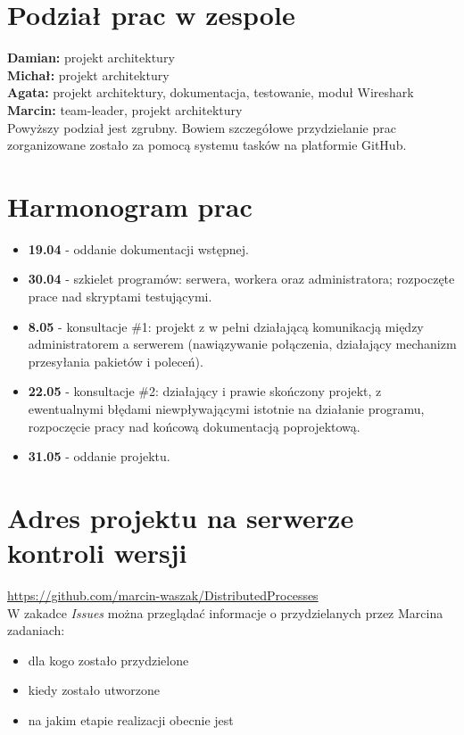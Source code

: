 \documentclass[paper=a4, fontsize=11pt]{scrartcl} %
\begin{document}
\section*{Podział prac w zespole}
\textbf{Damian:} projekt architektury \\
\textbf{Michał:} projekt architektury \\
\textbf{Agata:} projekt architektury, dokumentacja, testowanie, moduł Wireshark \\
\textbf{Marcin:} team-leader, projekt architektury \\

Powyższy podział jest zgrubny. Bowiem szczegółowe przydzielanie prac zorganizowane zostało za pomocą systemu tasków na platformie GitHub.

\section*{Harmonogram prac}
\begin{itemize}
\item \textbf{19.04} - oddanie dokumentacji wstępnej. 
\item \textbf{30.04} - szkielet programów: serwera, workera oraz administratora;  rozpoczęte prace nad skryptami testującymi. 
\item \textbf{8.05} - konsultacje \#1: projekt z w pełni działającą komunikacją między administratorem a serwerem (nawiązywanie połączenia, działający mechanizm przesyłania pakietów i poleceń). 
\item \textbf{22.05} - konsultacje \#2: działający i prawie skończony projekt, z ewentualnymi błędami niewpływającymi istotnie na działanie programu, rozpoczęcie pracy nad końcową dokumentacją poprojektową. 
\item \textbf{31.05} - oddanie projektu.
\end{itemize}

\section*{Adres projektu na serwerze kontroli wersji}
\url{https://github.com/marcin-waszak/DistributedProcesses}  \\

W zakadce \textit{Issues} można przeglądać informacje o przydzielanych przez Marcina zadaniach: 
\begin{itemize}
\item dla kogo zostało przydzielone
\item kiedy zostało utworzone
\item na jakim etapie realizacji obecnie jest
\end{itemize}
\end{document}
